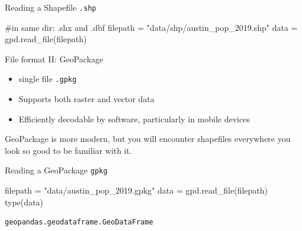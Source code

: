 \documentclass[
  ignorenonframetext,
]{beamer}
\newenvironment{Shaded}{\begin{snugshade}}{\end{snugshade}}
\newcommand{\BuiltInTok}[1]{\textcolor[rgb]{0.00,0.23,0.31}{#1}}
\newcommand{\CommentTok}[1]{\textcolor[rgb]{0.37,0.37,0.37}{#1}}
\newcommand{\NormalTok}[1]{\textcolor[rgb]{0.00,0.23,0.31}{#1}}
\newcommand{\OperatorTok}[1]{\textcolor[rgb]{0.37,0.37,0.37}{#1}}
\newcommand{\StringTok}[1]{\textcolor[rgb]{0.13,0.47,0.30}{#1}}
\providecommand{\tightlist}{%
  \setlength{\itemsep}{0pt}\setlength{\parskip}{0pt}}\usepackage{longtable,booktabs,array}
\begin{document}
\begin{frame}[fragile]{Reading a Shapefile \texttt{.shp}}
\label{reading-a-shapefile-.shp}
\begin{Shaded}
\begin{Highlighting}[]
\CommentTok{\#in same dir:  \textasciigrave{}.shx\textasciigrave{} and \textasciigrave{}.dbf\textasciigrave{}}
\NormalTok{filepath }\OperatorTok{=} \StringTok{"data/shp/austin\_pop\_2019.shp"}
\NormalTok{data }\OperatorTok{=}\NormalTok{ gpd.read\_file(filepath)}
\end{Highlighting}
\end{Shaded}
\end{frame}

\begin{frame}[fragile]{File format II: GeoPackage}
\label{file-format-ii-geopackage}
\begin{itemize}
\tightlist
\item
  single file \texttt{.gpkg}
\item
  Supports both raster and vector data
\item
  Efficiently decodable by software, particularly in mobile devices
\end{itemize}

GeoPackage is more modern, but you will encounter shapefiles everywhere
you look so good to be familiar with it.
\end{frame}

\begin{frame}[fragile]{Reading a GeoPackage \texttt{gpkg}}
\label{reading-a-geopackage-gpkg}
\begin{Shaded}
\begin{Highlighting}[]
\NormalTok{filepath }\OperatorTok{=} \StringTok{"data/austin\_pop\_2019.gpkg"}
\NormalTok{data }\OperatorTok{=}\NormalTok{ gpd.read\_file(filepath)}
\BuiltInTok{type}\NormalTok{(data)}
\end{Highlighting}
\end{Shaded}

\begin{verbatim}
geopandas.geodataframe.GeoDataFrame
\end{verbatim}
\end{frame}
\end{document}
